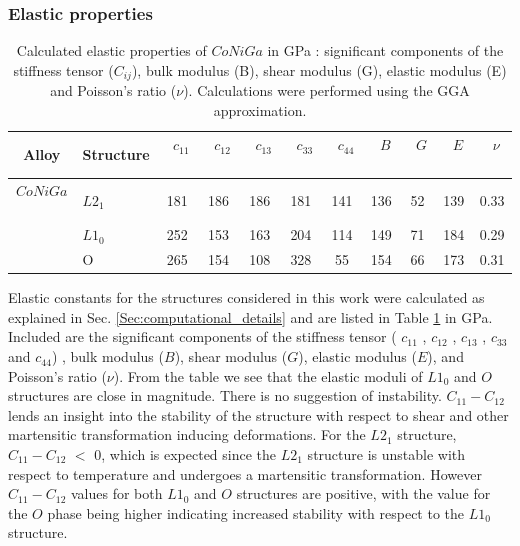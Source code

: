 \documentclass[%
preprint,
 amsmath,amssymb,
 aps,
prb,
showkeys,
]{revtex4-1}
\begin{document}
\subsubsection{Elastic properties}
\label{subsec:elastic}
\begin{table}
\begin{center}
\caption{Calculated elastic properties of $CoNiGa$  in GPa : significant components of the stiffness tensor ($C_{ij}$), bulk modulus (B), shear modulus (G), elastic modulus (E) and Poisson's ratio ($\nu$). Calculations were performed using the GGA \cite{Perdew1992} approximation. }
\begin{tabular}{clccccccccc}
\hline
Alloy& Structure& \ $c_{11}$ \ & \ $c_{12}$ \ & \ $c_{13}$ \ & \ $c_{33}$ \ & \ $c_{44}$ \ & \ $B$ \ & \ $G$ \ & \ $E$ \ & \ $\nu$ \ \\
\hline\hline
$CoNiGa$ \ &$L2_1$ & 181  & 186 & 186 & 181 & 141 &136  &52 &139  &0.33 \\
\vspace{0.5em}
 \ & $L1_0$ & 252 & 153 & 163 & 204 & 114 &149  &71  & 184 &0.29 \\
 \vspace{0.5em}
 \ & O & 265 & 154 &108 & 328 & 55  &154  &66  &173  &0.31 \\
\hline
\end{tabular}
\label{tab:elastic}
\end{center}
\end{table}

Elastic constants for the structures considered in this work were calculated  as explained in Sec. \ref{Sec:computational_details} and are listed in Table \ref{tab:elastic} in GPa. Included are the significant components of the stiffness tensor ( $c_{11}$ , $c_{12}$ , $c_{13}$ , $c_{33}$  and  $c_{44}$) , bulk modulus ($B$), shear modulus ($G$), elastic modulus ($E$), and Poisson's ratio ($\nu$). From the table we see that the elastic moduli of $L1_0$ and $O$ structures are close in magnitude. There is no suggestion of instability. $C_{11}-C_{12}$  lends an insight into the stability of the structure with respect to shear and other martensitic transformation inducing deformations. For the $L2_1$ structure,  $C_{11}-C_{12}$  $<$ $0$, which is expected since the $L2_1$ structure is  unstable with respect to temperature and undergoes a martensitic transformation. However $C_{11}-C_{12}$  values for both $L1_0$ and $O$ structures are positive,  with the value for the $O$ phase being higher indicating increased stability with respect to the $L1_0$ structure.
\end{document}
